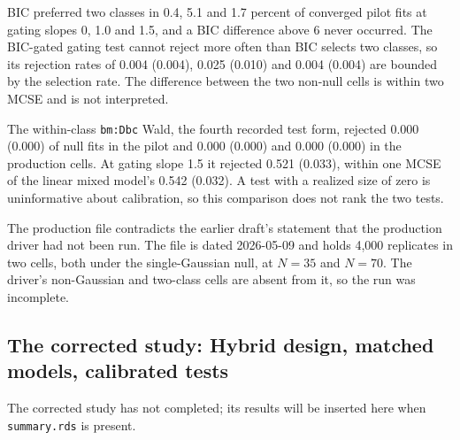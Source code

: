\documentclass[
  11pt,
]{article}
\begin{document}
BIC preferred two classes in 0.4,
5.1 and
1.7 percent of
converged pilot fits at gating slopes 0, 1.0 and 1.5, and a BIC
difference above 6 never occurred.
The BIC-gated gating test cannot reject more often than BIC selects
two classes, so its rejection rates of 0.004 (0.004),
0.025 (0.010) and 0.004 (0.004) are bounded by the
selection rate. The difference between the two non-null cells is
within two MCSE and is not interpreted.

The within-class \texttt{bm:Dbc} Wald, the fourth recorded test form,
rejected 0.000 (0.000) of null fits in the pilot and
0.000 (0.000) and 0.000 (0.000) in the production
cells. At gating slope 1.5 it rejected 0.521 (0.033), within
one MCSE of the linear mixed model's 0.542 (0.032). A test with a
realized size of zero is uninformative about calibration, so this
comparison does not rank the two tests.

The production file contradicts the earlier draft's statement that
the production driver had not been run. The file is dated
2026-05-09 and holds 4,000
replicates in two cells, both under the single-Gaussian null, at
\(N = 35\) and \(N = 70\). The driver's non-Gaussian and two-class cells
are absent from it, so the run was incomplete.

\subsection{The corrected study: Hybrid design, matched models, calibrated tests}\label{the-corrected-study-hybrid-design-matched-models-calibrated-tests}

The corrected study has not completed; its results will be inserted here when \texttt{summary.rds} is present.

\begingroup\fontsize{7}{9}\selectfont
\end{document}
